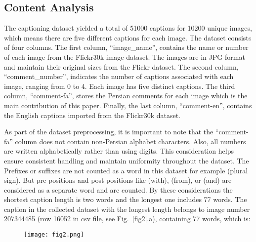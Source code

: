 \documentclass[runningheads]{llncs}
\begin{document}
\subsection{Content Analysis}
The captioning dataset yielded a total of 51000 captions for 10200 unique images, which means there are five different captions for each image. 
The dataset consists of four columns. The first column, ``image\_name'',
contains the name or number of each image from the Flickr30k image dataset. The images are in JPG format and maintain their original sizes from the Flickr dataset. The second column, ``comment\_number'', indicates the number of captions associated with each image, ranging from 0 to 4. Each image has five distinct captions. The third column, ``comment-fa'', stores the Persian comments for each image which is the main contribution of this paper. Finally, the last column, ``comment-en'', contains the English captions imported from the Flickr30k dataset.

As part of the dataset preprocessing, it is important to note that the ``comment-fa'' column does not contain non-Persian alphabet characters. Also, all numbers are written alphabetically rather than using digits. This consideration helps ensure consistent handling and maintain uniformity throughout the dataset. The Prefixes or suffixes are not counted as a word in this dataset for example (plural sign). But pre-positions and post-positions like (with), (from), or (and) are considered as a separate word and are counted. By these considerations the shortest caption length is two words and the longest one includes 77 words. The caption in the collected dataset with the longest length belongs to image number 207344485 (row 16052 in csv file, see Fig.~\ref{fig2}.a), containing 77 words, which is:

\vspace{-\baselineskip}
\begin{figure}[!htbp]
  \texttt{[image: fig2.png]}
\end{figure}
\vspace{-\baselineskip}
\end{document}
